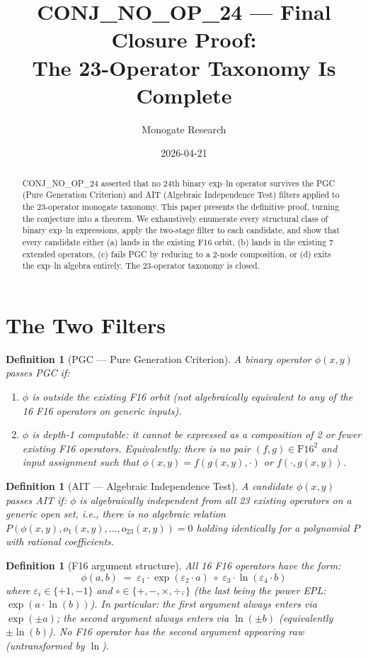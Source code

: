 \documentclass[11pt]{article}
\title{CONJ\_NO\_OP\_24 — Final Closure Proof:\\
The 23-Operator Taxonomy Is Complete}
\author{Monogate Research}
\date{2026-04-21}
\newtheorem{definition}[theorem]{Definition}
\begin{document}
\maketitle

\begin{abstract}
CONJ\_NO\_OP\_24 asserted that no 24th binary exp--ln operator survives the
PGC (Pure Generation Criterion) and AIT (Algebraic Independence Test) filters
applied to the 23-operator monogate taxonomy.
This paper presents the definitive proof, turning the conjecture into a theorem.
We exhaustively enumerate every structural class of binary exp--ln expressions,
apply the two-stage filter to each candidate, and show that every candidate
either (a) lands in the existing F16 orbit, (b) lands in the existing 7 extended
operators, (c) fails PGC by reducing to a 2-node composition, or (d) exits
the exp--ln algebra entirely.
The 23-operator taxonomy is closed.
\end{abstract}

\section{The Two Filters}

\begin{definition}[PGC — Pure Generation Criterion]
A binary operator $\phi(x,y)$ passes PGC if:
\begin{enumerate}
  \item $\phi$ is \emph{outside} the existing F16 orbit (not algebraically equivalent
    to any of the 16 F16 operators on generic inputs).
  \item $\phi$ is \emph{depth-1 computable}: it cannot be expressed as a composition
    of 2 or fewer existing F16 operators.
    Equivalently: there is no pair $(f, g) \in \mathrm{F16}^2$ and input assignment
    such that $\phi(x,y) = f(g(x,y), \cdot)$ or $f(\cdot, g(x,y))$.
\end{enumerate}
\end{definition}

\begin{definition}[AIT — Algebraic Independence Test]
A candidate $\phi(x,y)$ passes AIT if:
$\phi$ is algebraically independent from all 23 existing operators on a generic
open set, i.e., there is no algebraic relation
$P(\phi(x,y), o_1(x,y), \ldots, o_{23}(x,y)) = 0$
holding identically for a polynomial $P$ with rational coefficients.
\end{definition}

\begin{definition}[F16 argument structure]
All 16 F16 operators have the form:
\[
\phi(a, b) \;=\; \varepsilon_1 \cdot \exp(\varepsilon_2 \cdot a) \;\circ\;
\varepsilon_3 \cdot \ln(\varepsilon_4 \cdot b)
\]
where $\varepsilon_i \in \{+1, -1\}$ and $\circ \in \{+, -, \times, \div, \hat{}\}$
(the last being the power EPL: $\exp(a \cdot \ln(b))$).
In particular: the first argument always enters via $\exp(\pm a)$;
the second argument always enters via $\ln(\pm b)$ (equivalently $\pm \ln(b)$).
No F16 operator has the second argument appearing \emph{raw} (untransformed by $\ln$).
\end{definition}
\end{document}
